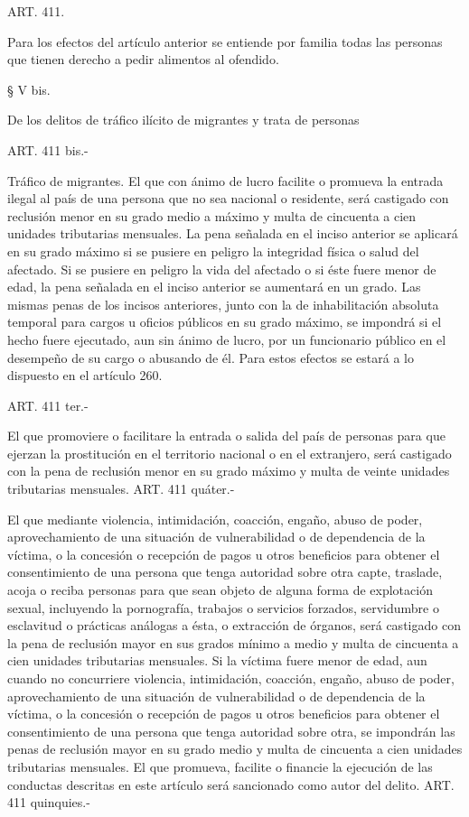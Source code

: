     ART. 411.

    Para los efectos del artículo anterior se entiende por familia todas las personas que tienen derecho a pedir alimentos al ofendido.

    § V bis.

    De los delitos de tráfico ilícito de migrantes y trata de personas


    ART. 411 bis.-

    Tráfico de migrantes. El que con ánimo de lucro facilite o promueva la entrada ilegal al país de una persona que no sea nacional o residente, será castigado con reclusión menor en su grado medio a máximo y multa de cincuenta a cien unidades tributarias mensuales.
    La pena señalada en el inciso anterior se aplicará en su grado máximo si se pusiere en peligro la integridad física o salud del afectado.
    Si se pusiere en peligro la vida del afectado o si éste fuere menor de edad, la pena señalada en el inciso anterior se aumentará en un grado.
    Las mismas penas de los incisos anteriores, junto con la de inhabilitación absoluta temporal para cargos u oficios públicos en su grado máximo, se impondrá si el hecho fuere ejecutado, aun sin ánimo de lucro, por un funcionario público en el desempeño de su cargo o abusando de él. Para estos efectos se estará a lo dispuesto en el artículo 260.


    ART. 411 ter.-

    El que promoviere o facilitare la entrada o salida del país de personas para que ejerzan la prostitución en el territorio nacional o en el extranjero, será castigado con la pena de reclusión menor en su grado máximo y multa de veinte unidades tributarias mensuales.
    ART. 411 quáter.-

    El que mediante violencia, intimidación, coacción, engaño, abuso de poder, aprovechamiento de una situación de vulnerabilidad o de dependencia de la víctima, o la concesión o recepción de pagos u otros beneficios para obtener el consentimiento de una persona que tenga autoridad sobre otra capte, traslade, acoja o reciba personas para que sean objeto de alguna forma de explotación sexual, incluyendo la pornografía, trabajos o servicios forzados, servidumbre o esclavitud o prácticas análogas a ésta, o extracción de órganos, será castigado con la pena de reclusión mayor en sus grados mínimo a medio y multa de cincuenta a cien unidades tributarias mensuales.
    Si la víctima fuere menor de edad, aun cuando no concurriere violencia, intimidación, coacción, engaño, abuso de poder, aprovechamiento de una situación de vulnerabilidad o de dependencia de la víctima, o la concesión o recepción de pagos u otros beneficios para obtener el consentimiento de una persona que tenga autoridad sobre otra, se impondrán las penas de reclusión mayor en su grado medio y multa de cincuenta a cien unidades tributarias mensuales.
    El que promueva, facilite o financie la ejecución de las conductas descritas en este artículo será sancionado como autor del delito.
    ART. 411 quinquies.-

